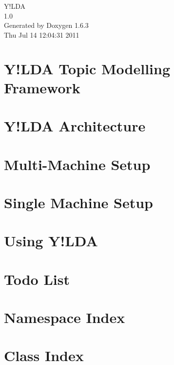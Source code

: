 \documentclass[letterpaper]{book}
\begin{document}
\hypersetup{pageanchor=false}
\begin{titlepage}
\vspace*{7cm}
\begin{center}
{\Large Y!LDA \\[1ex]\large 1.0 }\\
\vspace*{1cm}
{\large Generated by Doxygen 1.6.3}\\
\vspace*{0.5cm}
{\small Thu Jul 14 12:04:31 2011}\\
\end{center}
\end{titlepage}
\clearemptydoublepage
{}
\tableofcontents
\clearemptydoublepage
{}
\hypersetup{pageanchor=true}
\chapter{Y!LDA Topic Modelling Framework}
\label{index}\hypertarget{index}{}
\chapter{Y!LDA Architecture}
\label{architecture}
\hypertarget{architecture}{}

\chapter{Multi-\/Machine Setup}
\label{multi_machine_usage}
\hypertarget{multi_machine_usage}{}

\chapter{Single Machine Setup}
\label{single_machine_usage}
\hypertarget{single_machine_usage}{}

\chapter{Using Y!LDA}
\label{usage}
\hypertarget{usage}{}

\chapter{Todo List}
\label{todo}
\hypertarget{todo}{}

\chapter{Namespace Index}

\chapter{Class Index}

\end{document}
